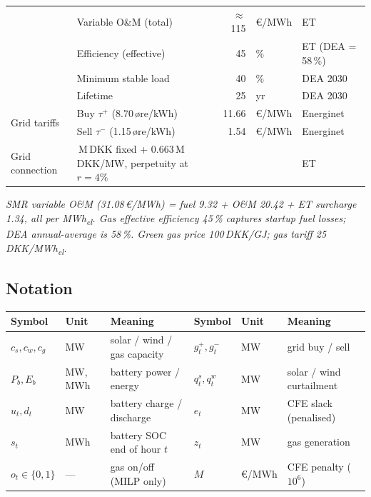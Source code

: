 \documentclass[10.5pt]{article}
\begin{document}
{\begin{tabularx}{\linewidth}{l >{\raggedright\arraybackslash}X r l l}
  & Variable O\&M (total) &   $\approx$115 & €/MWh & ET \\
  & Efficiency (effective) &    45 & \%     & ET (DEA = 58\,\%) \\
  & Minimum stable load   &    40 & \%     & DEA 2030 \\
  & Lifetime              &     25 & yr     & DEA 2030 \\
\midrule
\multirow{2}{*}{Grid tariffs}
  & Buy $\tau^+$ (8.70\,øre/kWh) & 11.66 & €/MWh & Energinet \\
  & Sell $\tau^-$ (1.15\,øre/kWh) &  1.54 & €/MWh & Energinet \\
\midrule
Grid connection & 18.2\,M\,DKK fixed + 0.663\,M\,DKK/MW, perpetuity at $r=4\%$ &&& ET \\
\bottomrule
\end{tabularx}}

\smallskip
\textit{SMR variable O\&M (31.08\,€/MWh) = fuel 9.32 + O\&M 20.42 + ET surcharge 1.34, all per
MWh\textsubscript{el}.
Gas effective efficiency 45\,\% captures startup fuel losses; DEA annual-average is 58\,\%.
Green gas price 100\,DKK/GJ; gas tariff 25\,DKK/MWh\textsubscript{el}.}

\subsection*{Notation}

{\footnotesize
\begin{tabularx}{\linewidth}{l l >{\raggedright\arraybackslash}X l l >{\raggedright\arraybackslash}X}
\toprule
Symbol & Unit & Meaning & Symbol & Unit & Meaning \\
\midrule
$c_s,c_w,c_g$ & MW & solar / wind / gas capacity &
  $g^+_t, g^-_t$ & MW & grid buy / sell \\
$P_b, E_b$ & MW, MWh & battery power / energy &
  $q^s_t, q^w_t$ & MW & solar / wind curtailment \\
$u_t, d_t$ & MW & battery charge / discharge &
  $e_t$ & MW & CFE slack (penalised) \\
$s_t$ & MWh & battery SOC end of hour $t$ &
  $z_t$ & MW & gas generation \\
$o_t \in \{0,1\}$ & — & gas on/off (MILP only) &
  $M$ & €/MWh & CFE penalty ($10^6$) \\
\bottomrule
\end{tabularx}}

\end{document}

